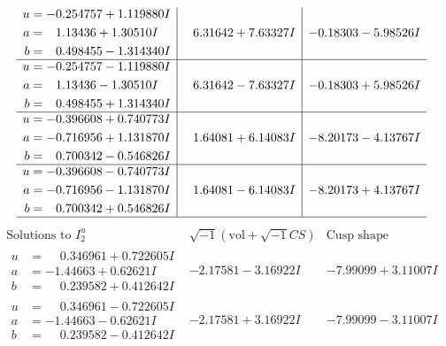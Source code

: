 \documentclass[1p]{elsarticle_modified}
\theoremstyle{definition}
\newcommand{\I}{\sqrt{-1}}
\begin{document}
$$\begin{array}{c|c|c}
\begin{aligned}
u &= -0.254757 + 1.119880 I \\
a &= \phantom{-}1.13436 + 1.30510 I \\
b &= \phantom{-}0.498455 - 1.314340 I\end{aligned}
 & \phantom{-}6.31642 + 7.63327 I & -0.18303 - 5.98526 I \\ \hline\begin{aligned}
u &= -0.254757 - 1.119880 I \\
a &= \phantom{-}1.13436 - 1.30510 I \\
b &= \phantom{-}0.498455 + 1.314340 I\end{aligned}
 & \phantom{-}6.31642 - 7.63327 I & -0.18303 + 5.98526 I \\ \hline\begin{aligned}
u &= -0.396608 + 0.740773 I \\
a &= -0.716956 + 1.131870 I \\
b &= \phantom{-}0.700342 - 0.546826 I\end{aligned}
 & \phantom{-}1.64081 + 6.14083 I & -8.20173 - 4.13767 I \\ \hline\begin{aligned}
u &= -0.396608 - 0.740773 I \\
a &= -0.716956 - 1.131870 I \\
b &= \phantom{-}0.700342 + 0.546826 I\end{aligned}
 & \phantom{-}1.64081 - 6.14083 I & -8.20173 + 4.13767 I\\
 \hline 
 \end{array}$$\newpage$$\begin{array}{c|c|c}  
\text{Solutions to }I^u_{2}& \I (\text{vol} + \sqrt{-1}CS) & \text{Cusp shape}\\
 \hline 
\begin{aligned}
u &= \phantom{-}0.346961 + 0.722605 I \\
a &= -1.44663 + 0.62621 I \\
b &= \phantom{-}0.239582 + 0.412642 I\end{aligned}
 & -2.17581 - 3.16922 I & -7.99099 + 3.11007 I \\ \hline\begin{aligned}
u &= \phantom{-}0.346961 - 0.722605 I \\
a &= -1.44663 - 0.62621 I \\
b &= \phantom{-}0.239582 - 0.412642 I\end{aligned}
 & -2.17581 + 3.16922 I & -7.99099 - 3.11007 I \\ \hline\begin{aligned}

\end{aligned}
\end{array}$$
\end{document}
